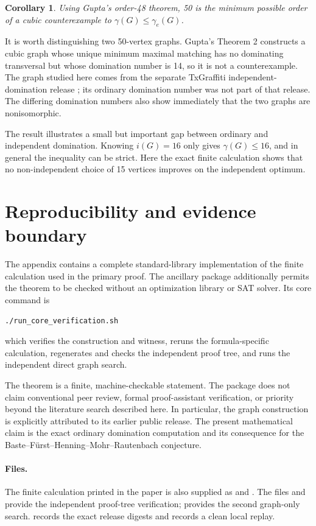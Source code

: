 \documentclass[11pt]{article}
\newtheorem{corollary}[theorem]{Corollary}
\theoremstyle{definition}
\theoremstyle{remark}
\begin{document}
\begin{corollary}\label{cor:minimal}
Using Gupta's order-48 theorem, 50 is the minimum possible order of a cubic counterexample to \(\gamma(G)\leq\gamma_e(G)\).
\end{corollary}

It is worth distinguishing two 50-vertex graphs.  Gupta's Theorem 2 constructs a cubic graph whose unique minimum maximal matching has no dominating transversal but whose domination number is 14, so it is not a counterexample.  The graph studied here comes from the separate TxGraffiti independent-domination release \cite{TxGraffiti2026}; its ordinary domination number was not part of that release.  The differing domination numbers also show immediately that the two graphs are nonisomorphic.

The result illustrates a small but important gap between ordinary and independent domination.  Knowing \(i(G)=16\) only gives \(\gamma(G)\leq16\), and in general the inequality can be strict.  Here the exact finite calculation shows that no non-independent choice of 15 vertices improves on the independent optimum.

\section{Reproducibility and evidence boundary}
The appendix contains a complete standard-library implementation of the finite calculation used in the primary proof.  The ancillary package additionally permits the theorem to be checked without an optimization library or SAT solver.  Its core command is
\begin{verbatim}
./run_core_verification.sh
\end{verbatim}
which verifies the construction and witness, reruns the formula-specific calculation, regenerates and checks the independent proof tree, and runs the independent direct graph search.

The theorem is a finite, machine-checkable statement.  The package does not claim conventional peer review, formal proof-assistant verification, or priority beyond the literature search described here.  In particular, the graph construction is explicitly attributed to its earlier public release.  The present mathematical claim is the exact ordinary domination computation and its consequence for the Baste--F\"urst--Henning--Mohr--Rautenbach conjecture.

\paragraph{Files.}
The finite calculation printed in the paper is also supplied as  and .  The files  and  provide the independent proof-tree verification;  provides the second graph-only search.   records the exact release digests and  records a clean local replay.
\end{document}
